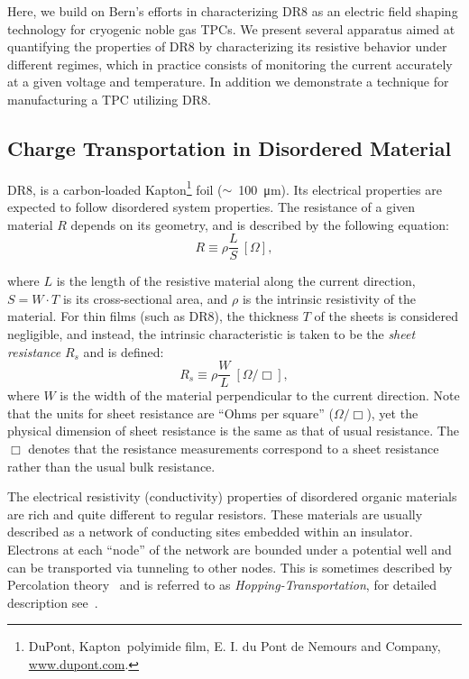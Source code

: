 \documentclass[a4paper,12pt]{article}
\newcommand{\DR}{DR8}
\begin{document}
Here, we build on Bern's efforts in characterizing {\DR} as an electric field shaping technology for cryogenic noble gas TPCs.
We present several apparatus aimed at quantifying the properties of {\DR} by characterizing its resistive behavior under different regimes, which in practice consists of monitoring the current accurately at a given voltage and temperature. 
In addition we demonstrate a technique for manufacturing a TPC utilizing {\DR}.

\subsection{Charge Transportation in Disordered Material}
\label{sec:disorder_Mattrial}

{\DR}, is a carbon-loaded Kapton\footnote{DuPont\texttrademark, Kapton\textregistered \, polyimide film, E. I. du Pont de Nemours and Company, \url{www.dupont.com}.} foil ($\sim$~\SI{100}{\micro\metre}). 
Its electrical properties are expected to follow disordered system properties. 
The resistance of a given material $R$ depends on its geometry, and is described by the following equation:
\begin{equation}
\label{eq:Res_3D}
R \equiv \rho \frac{L}{S} \ [\Omega],
\end{equation}

where $L$ is the length of the resistive material along the current direction, $S = W \cdot T$ is its cross-sectional area, and $\rho$ is the intrinsic resistivity of the material. 
For thin films (such as {\DR}), the thickness $T$ of the sheets is considered negligible, and instead, the intrinsic characteristic is taken to be the \emph{sheet resistance} $R_s$ and is defined:
\begin{equation}
\label{eq:res_2D}
R_s \equiv \rho \frac{W}{L} \ [\Omega / \Box],
\end{equation}
where $W$ is the width of the material perpendicular to the current direction. 
Note that the units for sheet resistance are ``Ohms per square'' ($\Omega / \Box$), yet the physical dimension of sheet resistance is the same as that of usual resistance. 
The $\Box$ denotes that the resistance measurements correspond to a sheet resistance rather than the usual bulk resistance.

The electrical resistivity (conductivity) properties of disordered organic materials are rich and quite different to regular resistors. 
These materials are usually described as a network of conducting sites embedded within an insulator. 
Electrons at each ``node'' of the network are bounded under a potential well and can be transported via tunneling to other nodes. 
This is sometimes described by Percolation theory~\cite{Havlin1996} and is referred to as \emph{Hopping-Transportation}, for detailed description see~\cite{organicDisorderMaterial,electronicPhotonicMaterials}.
\end{document}
